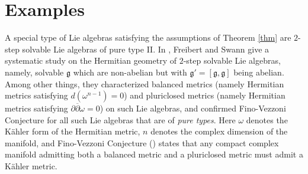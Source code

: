\documentclass{amsart}
\begin{document}
\vspace{0.3cm}



\section{Examples}

A special type of Lie algebras satisfying the assumptions of Theorem \ref{thm} are $2$-step solvable Lie algebras of pure type II. In \cite{FSwann, FSwann2}, Freibert and Swann give a systematic study on the Hermitian geometry of $2$-step solvable Lie algebras, namely, solvable ${\mathfrak g}$ which are non-abelian but with ${\mathfrak g}'= [{\mathfrak g}, {\mathfrak g}]$ being abelian. Among other things, they characterized balanced metrics (namely Hermitian metrics satisfying $d(\omega^{n-1})=0$) and pluriclosed metrics (namely Hermitian metrics satisfying $\partial \overline{\partial} \omega =0$) on such Lie algebras, and confirmed Fino-Vezzoni Conjecture for all such Lie algebras that are of {\em pure types}. Here $\omega$ denotes the K\"ahler form of the Hermitian metric, $n$ denotes the complex dimension of the manifold, and Fino-Vezzoni Conjecture (\cite{FV15, FV16}) states  that any compact complex manifold admitting both a balanced metric and a pluriclosed metric must admit a K\"ahler metric. 
\end{document}
